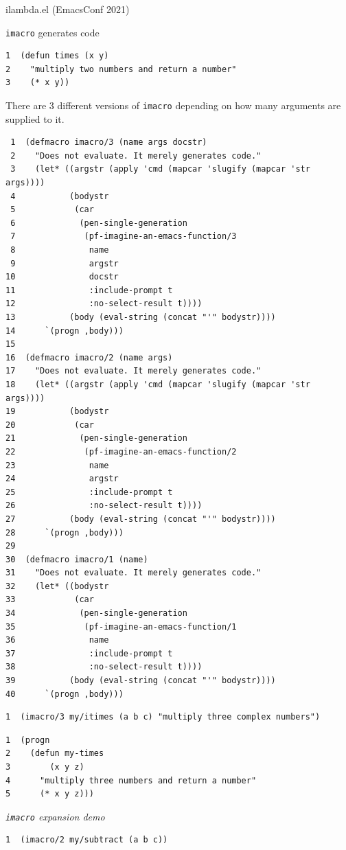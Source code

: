\documentclass[presentation]{beamer}
\begin{document}
\begin{frame}[label={sec:orgbf8b945},fragile]{ilambda.el (EmacsConf 2021)}
\begin{block}{\texttt{imacro} generates code}
\begin{verbatim}
1  (defun times (x y)
2    "multiply two numbers and return a number"
3    (* x y))
\end{verbatim}

There are 3 different versions of \texttt{imacro}
depending on how many arguments are supplied to
it.

\begin{verbatim}
 1  (defmacro imacro/3 (name args docstr)
 2    "Does not evaluate. It merely generates code."
 3    (let* ((argstr (apply 'cmd (mapcar 'slugify (mapcar 'str args))))
 4           (bodystr
 5            (car
 6             (pen-single-generation
 7              (pf-imagine-an-emacs-function/3
 8               name
 9               argstr
10               docstr
11               :include-prompt t
12               :no-select-result t))))
13           (body (eval-string (concat "'" bodystr))))
14      `(progn ,body)))
15  
16  (defmacro imacro/2 (name args)
17    "Does not evaluate. It merely generates code."
18    (let* ((argstr (apply 'cmd (mapcar 'slugify (mapcar 'str args))))
19           (bodystr
20            (car
21             (pen-single-generation
22              (pf-imagine-an-emacs-function/2
23               name
24               argstr
25               :include-prompt t
26               :no-select-result t))))
27           (body (eval-string (concat "'" bodystr))))
28      `(progn ,body)))
29  
30  (defmacro imacro/1 (name)
31    "Does not evaluate. It merely generates code."
32    (let* ((bodystr
33            (car
34             (pen-single-generation
35              (pf-imagine-an-emacs-function/1
36               name
37               :include-prompt t
38               :no-select-result t))))
39           (body (eval-string (concat "'" bodystr))))
40      `(progn ,body)))
\end{verbatim}

\begin{verbatim}
1  (imacro/3 my/itimes (a b c) "multiply three complex numbers")
\end{verbatim}

\begin{verbatim}
1  (progn
2    (defun my-times
3        (x y z)
4      "multiply three numbers and return a number"
5      (* x y z)))
\end{verbatim}

\emph{\texttt{imacro} expansion demo}

\begin{verbatim}
1  (imacro/2 my/subtract (a b c))
\end{verbatim}


\end{block}
\end{frame}
\end{document}
